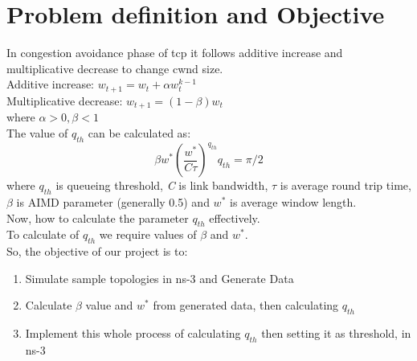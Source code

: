 \clearpage
\section{Problem definition and Objective}
In congestion avoidance phase of tcp it follows additive increase and multiplicative decrease to change cwnd size. \\
Additive increase: \( w_{t+1} = w_{t} + \alpha w_{t}^{k-1} \)\\
Multiplicative decrease: \( w_{t+1} = (1-\beta)w_{t}  \)\\
where \( \alpha > 0, \beta < 1 \)\\
The value of \( q_{th} \) can be calculated as: \\ 
\[
    \beta w^* \left(\frac{w^*}{C \tau}\right)^{q_{th}}{q_{th}} = \pi/2
\]
where $ q_{th} $ is queueing threshold, \textit{C} is link bandwidth, $ \tau $ is average round trip time, $ \beta $ is AIMD parameter (generally 0.5) and $ w^* $ is average window length.\\
Now, how to calculate the parameter \( q_{th} \) effectively.  \\
To calculate of $ q_{th} $ we require values of $ \beta $ and $ w^* $. \\
So, the objective of our project is to: 
\begin{enumerate}
    \item Simulate sample topologies in ns-3 and Generate Data 
    \item Calculate \( \beta \) value and $ w^* $ from generated data, then calculating \( q_{th} \) 
    \item Implement this whole process of calculating $ q_{th} $ then setting it as threshold, in ns-3 
\end{enumerate}

\clearpage

